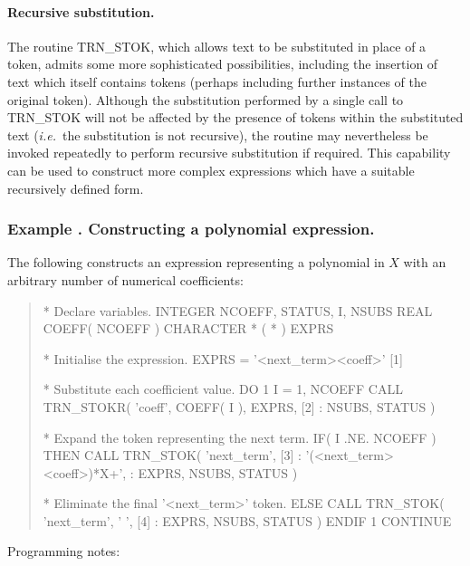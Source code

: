 \documentclass[twoside,nolof,11pt]{starlink}
\providecommand{\name}[1]{\small{#1}}
\newcounter{examplecounter}
\providecommand{\example}[1]{\addtocounter{examplecounter}{1}
                         \subsubsection*{Example \theexamplecounter. #1}}
\begin{document}
\paragraph{Recursive substitution.}
The routine \name{TRN\_STOK}, which allows text to be substituted in place
of a token, admits some more sophisticated possibilities, including the
insertion of text which itself contains tokens (perhaps including further
instances of the original token).
Although the substitution performed by a single call to \name{TRN\_STOK}
will not be affected by the presence of tokens within the substituted text
(\emph{i.e.}\ the substitution is not recursive), the routine may nevertheless
be invoked repeatedly to perform recursive substitution if required.
This capability can be used to construct more complex expressions which have
a suitable recursively defined form.

\example{Constructing a polynomial expression.}
The following constructs an expression representing a polynomial in $X$ with
an arbitrary number of numerical coefficients:

\begin{quote}
\begin{terminalv}
*  Declare variables.
      INTEGER NCOEFF, STATUS, I, NSUBS
      REAL COEFF( NCOEFF )
      CHARACTER * ( * ) EXPRS

*  Initialise the expression.
      EXPRS = '<next_term><coeff>'                     [1]

*  Substitute each coefficient value.
      DO 1 I = 1, NCOEFF
         CALL TRN_STOKR( 'coeff', COEFF( I ), EXPRS,   [2]
     :                   NSUBS, STATUS )

*  Expand the token representing the next term.
         IF( I .NE. NCOEFF ) THEN
            CALL TRN_STOK( 'next_term',                [3]
     :                     '(<next_term><coeff>)*X+',
     :                     EXPRS, NSUBS, STATUS )

*  Eliminate the final '<next_term>' token.
         ELSE
            CALL TRN_STOK( 'next_term', ' ',           [4]
     :                     EXPRS, NSUBS, STATUS )
         ENDIF
   1  CONTINUE

\end{terminalv}
\end{quote}

Programming notes:
\end{document}
